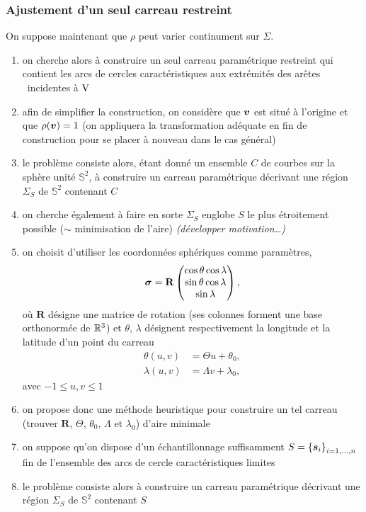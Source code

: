 \subsubsection{Ajustement d'un seul carreau restreint}%
\label{section:ajustement_carreau_spherique}
\def\s{\vit{s}}
On suppose maintenant que $\rho$ peut varier continument sur $\Sigma$. 

\begin{enumerate}
	\item on cherche alors à construire un seul carreau paramétrique restreint qui contient les arcs de cercles caractéristiques aux extrémités des arêtes \brep\ incidentes à $\mathrm{V}$
	\item afin de simplifier la construction, on considère que $\bm{v}$ est situé à l'origine et que $\rho(\bm{v}) = 1$ (on appliquera la transformation adéquate en fin de construction pour se placer à nouveau dans le cas général)
	\item le problème consiste alors, étant donné un ensemble $C$ de courbes sur la sphère unité $\mathbb{S}^2$, à construire un carreau paramétrique décrivant une région $\Sigma_S$ de $\mathbb{S}^2$ contenant $C$
	\item on cherche également à faire en sorte $\Sigma_S$ englobe $S$ le plus étroitement possible ($\sim$ minimisation de l'aire) \textit{(développer motivation\ldots)}
	
	\item on choisit d'utiliser les coordonnées sphériques comme paramètres, \ie
	\begin{equation}
	    \bm{\sigma} = \mathbf{R} 
	    \begin{pmatrix}
		    \cos \theta \cos \lambda \\
		    \sin \theta \cos \lambda \\
		    \sin \lambda \\
	    \end{pmatrix},
	\end{equation}
	où $\mathbf{R}$ désigne une matrice de rotation (\ie ses colonnes forment une base orthonormée de $\mathbb{R}^3$) et $\theta$, $\lambda$ désignent respectivement la longitude et la latitude d'un point du carreau
	\begin{align*}
	    \theta(u,v)  &= \Theta u + \theta_0, \\
	    \lambda(u,v) &= \Lambda v + \lambda_0,
	\end{align*}
	avec $-1 \leq u, v \leq 1$


	\item on propose donc une méthode heuristique pour construire un tel carreau (\ie trouver $\mathbf{R}$, $\Theta$, $\theta_0$, $\Lambda$ et $\lambda_0$) d'aire minimale
	\item on suppose qu'on dispose d'un échantillonnage suffisamment $S = \family{\s}{i}{1}{n}$ fin de l'ensemble des arcs de cercle caractéristiques limites
	\item le problème consiste alors à construire un carreau paramétrique décrivant une région $\Sigma_S$ de $\mathbb{S}^2$ contenant $S$
	

\end{enumerate}
